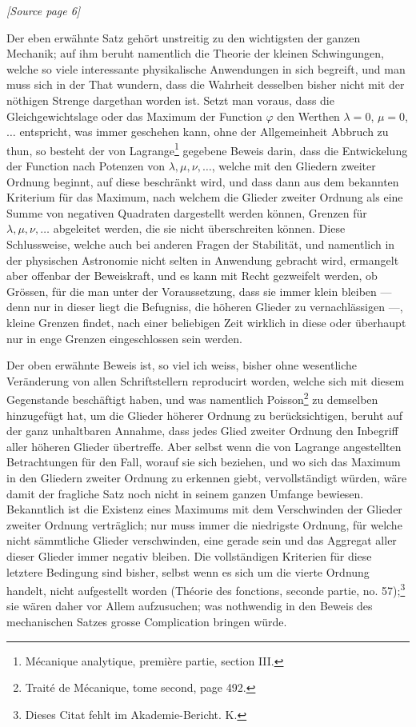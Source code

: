 \documentclass[11pt]{article}
\newcommand{\sourcepage}[1]{\par\smallskip\noindent\textit{[Source page #1]}\par\smallskip}
\begin{document}
\sourcepage{6}

Der eben erwähnte Satz gehört unstreitig zu den wichtigsten der ganzen Mechanik; auf ihm beruht namentlich die Theorie der kleinen Schwingungen, welche so viele interessante physikalische Anwendungen in sich begreift, und man muss sich in der That wundern, dass die Wahrheit desselben bisher nicht mit der nöthigen Strenge dargethan worden ist. Setzt man voraus, dass die Gleichgewichtslage oder das Maximum der Function $\varphi$ den Werthen $\lambda=0$, $\mu=0$, $\ldots$ entspricht, was immer geschehen kann, ohne der Allgemeinheit Abbruch zu thun, so besteht der von Lagrange\footnote{Mécanique analytique, première partie, section III.} gegebene Beweis darin, dass die Entwickelung der Function nach Potenzen von $\lambda,\mu,\nu,\ldots$, welche mit den Gliedern zweiter Ordnung beginnt, auf diese beschränkt wird, und dass dann aus dem bekannten Kriterium für das Maximum, nach welchem die Glieder zweiter Ordnung als eine Summe von negativen Quadraten dargestellt werden können, Grenzen für $\lambda,\mu,\nu,\ldots$ abgeleitet werden, die sie nicht überschreiten können. Diese Schlussweise, welche auch bei anderen Fragen der Stabilität, und namentlich in der physischen Astronomie nicht selten in Anwendung gebracht wird, ermangelt aber offenbar der Beweiskraft, und es kann mit Recht gezweifelt werden, ob Grössen, für die man unter der Voraussetzung, dass sie immer klein bleiben --- denn nur in dieser liegt die Befugniss, die höheren Glieder zu vernachlässigen ---, kleine Grenzen findet, nach einer beliebigen Zeit wirklich in diese oder überhaupt nur in enge Grenzen eingeschlossen sein werden.

Der oben erwähnte Beweis ist, so viel ich weiss, bisher ohne wesentliche Veränderung von allen Schriftstellern reproducirt worden, welche sich mit diesem Gegenstande beschäftigt haben, und was namentlich Poisson\footnote{Traité de Mécanique, tome second, page 492.} zu demselben hinzugefügt hat, um die Glieder höherer Ordnung zu berücksichtigen, beruht auf der ganz unhaltbaren Annahme, dass jedes Glied zweiter Ordnung den Inbegriff aller höheren Glieder übertreffe. Aber selbst wenn die von Lagrange angestellten Betrachtungen für den Fall, worauf sie sich beziehen, und wo sich das Maximum in den Gliedern zweiter Ordnung zu erkennen giebt, vervollständigt würden, wäre damit der fragliche Satz noch nicht in seinem ganzen Umfange bewiesen. Bekanntlich ist die Existenz eines Maximums mit dem Verschwinden der Glieder zweiter Ordnung verträglich; nur muss immer die niedrigste Ordnung, für welche nicht sämmtliche Glieder verschwinden, eine gerade sein und das Aggregat aller dieser Glieder immer negativ bleiben. Die vollständigen Kriterien für diese letztere Bedingung sind bisher, selbst wenn es sich um die vierte Ordnung handelt, nicht aufgestellt worden (Théorie des fonctions, seconde partie, no. 57);\footnote{Dieses Citat fehlt im Akademie-Bericht. K.} sie wären daher vor Allem aufzusuchen; was nothwendig in den Beweis des mechanischen Satzes grosse Complication bringen würde.
\end{document}
